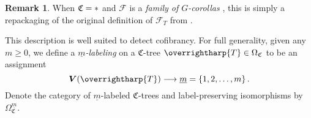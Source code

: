 \documentclass[a4paper,10pt
,draft
]{article}%
\numberwithin{equation}{section}
\numberwithin{figure}{section}
\theoremstyle{definition} %
\newtheorem{remark}[equation]{Remark}%
\newcommand{\set}[1]{\left\{#1\right\}}%
\newcommand{\sets}[2]{\left\{ #1 \;|\; #2\right\}}%
\newcommand{\longto}{\longrightarrow}%
\newcommand{\vect}[1]{\text{\overrightharp{\ensuremath{#1}}}}
\DeclareMathOperator{\Aut}{Aut}%
\newcommand{\F}{\ensuremath{\mathcal F}}
\newcommand{\1}{\ensuremath{\mathbbm 1}}%
\begin{document}

\begin{remark}
      When $\mathfrak C = \**$ and $\F$ is a \textit{family of $G$-corollas} \cite[Defn. 4.44]{BP_geo},
      this is simply a repackaging of the original definition of $\F_T$ from \cite[Prop. 6.44]{BP_geo}.
\end{remark}






This description is well suited to detect cofibrancy.
%
For full generality, given any $m \geq 0$, we define a \textit{$\underline{m}$-labeling} on a $\mathfrak C$-tree $\vect T \in \Omega_{\mathfrak C}$
to be an assignment
\[
      \boldsymbol{V}(\vect T) \longto \underline{m} = \set{1,2,\dots,m}.
\]
Denote the category of $\underline{m}$-labeled $\mathfrak C$-trees and label-preserving isomorphisms by $\Omega^{\underline{m}}_{\mathfrak C}$.
\end{document}
